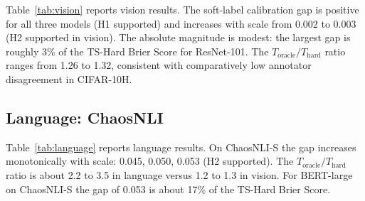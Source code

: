 \documentclass[11pt,a4paper]{article}
\theoremstyle{definition}
\begin{document}
Table~\ref{tab:vision} reports vision results. The soft-label
calibration gap is positive for all three models (H1 supported) and
increases with scale from 0.002 to 0.003 (H2 supported in vision). The
absolute magnitude is modest: the largest gap is roughly 3\% of the
TS-Hard Brier Score for ResNet-101. The
$T_{\mathrm{oracle}}/T_{\mathrm{hard}}$ ratio ranges from 1.26 to 1.32,
consistent with comparatively low annotator disagreement in CIFAR-10H.

\subsection{Language: ChaosNLI}

\begin{table}[t]
\centering
\caption{Calibration results on ChaosNLI-S and ChaosNLI-M.
DS~$=$~split (S~$=$~SNLI-derived, M~$=$~MNLI-derived).
BERT-large on ChaosNLI-S uses an independent SNLI checkpoint
($T_{\mathrm{hard}}\approx0.980$). Values are mean (std) over 3 seeds.}
\label{tab:language}
\footnotesize
\setlength{\tabcolsep}{2.6pt}
\end{table}

Table~\ref{tab:language} reports language results. On ChaosNLI-S the gap
increases monotonically with scale: 0.045, 0.050, 0.053 (H2 supported).
The $T_{\mathrm{oracle}}/T_{\mathrm{hard}}$ ratio is about 2.2 to 3.5 in
language versus 1.2 to 1.3 in vision. For BERT-large on ChaosNLI-S the
gap of 0.053 is about 17\% of the TS-Hard Brier Score.
\end{document}
